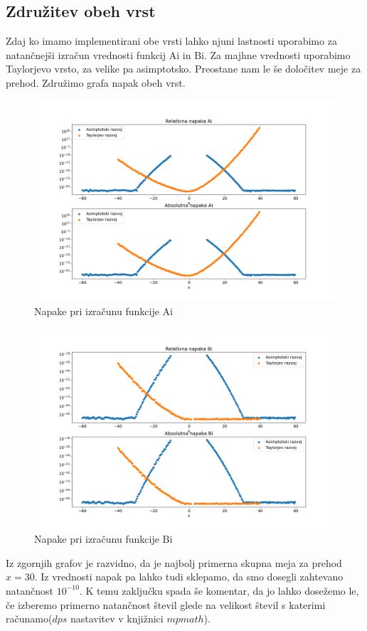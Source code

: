 \documentclass{article}
\newcommand{\Ai}{\mathrm{Ai}}
\newcommand{\Bi}{\mathrm{Bi}}
\begin{document}
\subsection{Združitev obeh vrst}
Zdaj ko imamo implementirani obe vrsti lahko njuni lastnosti uporabimo za natančnejši izračun vrednosti funkcij $\Ai$ in $\Bi$. Za majhne vrednosti uporabimo Taylorjevo vrsto, za velike pa asimptotsko. Preostane nam le še določitev meje za prehod. Združimo grafa napak obeh vrst.
\begin{figure}[H]
    \centering
    \includegraphics[width=1\textwidth]{primerjava_razvojev_Ai.png}
    \caption{Napake pri izračunu funkcije $\Ai$}
\end{figure}
\begin{figure}[H]
    \centering
    \includegraphics[width=1\textwidth]{primerjava_razvojev_Bi.png}
    \caption{Napake pri izračunu funkcije $\Bi$}
\end{figure}
\newpage
Iz zgornjih grafov je razvidno, da je najbolj primerna skupna meja za prehod $x=30$. Iz vrednosti napak pa lahko tudi sklepamo, da smo dosegli zahtevano natančnost $10^{-10}$. K temu zaključku spada še komentar, da jo lahko dosežemo le, če izberemo primerno natančnost števil glede na velikost števil s katerimi računamo($dps$ nastavitev v knjižnici $mpmath$).
\end{document}
